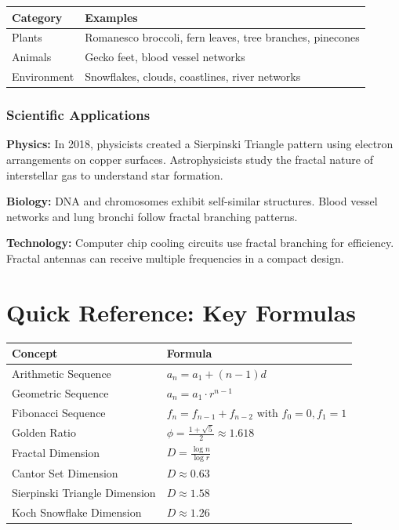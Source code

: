 \documentclass[11pt,a4paper]{article}
\begin{document}
\begin{center}
\begin{tabular}{l|l}
\toprule
\textbf{Category} & \textbf{Examples} \\
\midrule
Plants & Romanesco broccoli, fern leaves, tree branches, pinecones \\
Animals & Gecko feet, blood vessel networks \\
Environment & Snowflakes, clouds, coastlines, river networks \\
\bottomrule
\end{tabular}
\end{center}

\subsubsection{Scientific Applications}

\textbf{Physics:} In 2018, physicists created a Sierpinski Triangle pattern using electron arrangements on copper surfaces. Astrophysicists study the fractal nature of interstellar gas to understand star formation.

\textbf{Biology:} DNA and chromosomes exhibit self-similar structures. Blood vessel networks and lung bronchi follow fractal branching patterns.

\textbf{Technology:} Computer chip cooling circuits use fractal branching for efficiency. Fractal antennas can receive multiple frequencies in a compact design.

\newpage


\section*{Quick Reference: Key Formulas}

\begin{center}
\renewcommand{\arraystretch}{1.8}
\begin{tabular}{l|l}
\toprule
\textbf{Concept} & \textbf{Formula} \\
\midrule
Arithmetic Sequence & $a_n = a_1 + (n-1)d$ \\
Geometric Sequence & $a_n = a_1 \cdot r^{n-1}$ \\
Fibonacci Sequence & $f_n = f_{n-1} + f_{n-2}$ with $f_0=0, f_1=1$ \\
Golden Ratio & $\phi = \displaystyle\frac{1+\sqrt{5}}{2} \approx 1.618$ \\
Fractal Dimension & $D = \displaystyle\frac{\log n}{\log r}$ \\
Cantor Set Dimension & $D \approx 0.63$ \\
Sierpinski Triangle Dimension & $D \approx 1.58$ \\
Koch Snowflake Dimension & $D \approx 1.26$ \\
\bottomrule
\end{tabular}
\end{center}
\end{document}

